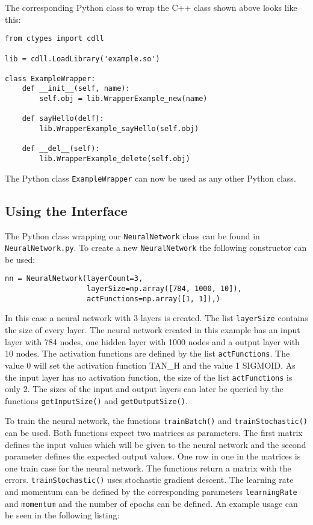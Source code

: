 \documentclass{acm_proc_article-sp}
\begin{document}
The corresponding Python class to wrap the C++ class shown above looks like this:

\lstset{language=Python}
\begin{lstlisting}[caption=Python class wrapping the C++ class shown above (Example.py)]
from ctypes import cdll

lib = cdll.LoadLibrary('example.so')

class ExampleWrapper:
    def __init__(self, name):
        self.obj = lib.WrapperExample_new(name)
        
    def sayHello(delf):
        lib.WrapperExample_sayHello(self.obj)
        
    def __del__(self): 
        lib.WrapperExample_delete(self.obj)
\end{lstlisting}

The Python class \texttt{ExampleWrapper} can now be used as any other Python class.

\subsection{Using the Interface}
The Python class wrapping our \texttt{NeuralNetwork} class can be found in \texttt{NeuralNetwork.py}. To create a new \texttt{NeuralNetwork} the following constructor can be used:

\lstset{language=Python}
\begin{lstlisting}[caption=Constructor to create a neural network]
nn = NeuralNetwork(layerCount=3,
                   layerSize=np.array([784, 1000, 10]),
                   actFunctions=np.array([1, 1]),)
\end{lstlisting}

In this case a neural network with 3 layers is created. The list \texttt{layerSize} contains the size of every layer. The neural network created in this example has an input layer with 784 nodes, one hidden layer with 1000 nodes and a output layer with 10 nodes. The activation functions are defined by the list \texttt{actFunctions}. The value 0 will set the activation function TAN\_H and the value 1 SIGMOID. As the input layer has no activation function, the size of the list \texttt{actFunctions} is only 2. The sizes of the input and output layers can later be queried by the functions \texttt{getInputSize()} and \texttt{getOutputSize()}.

To train the neural network, the functions \texttt{trainBatch()} and \texttt{trainStochastic()} can be used. Both functions expect two matrices as parameters. The first matrix defines the input values which will be given to the neural network and the second parameter defines the expected output values. One row in one in the matrices is one train case for the neural network. The functions return a matrix with the errors. \texttt{trainStochastic()} uses stochastic gradient descent. The learning rate and momentum can be defined by the corresponding parameters \texttt{learningRate} and \texttt{momentum} and the number of epochs can be defined. An example usage can be seen in the following listing:
\end{document}
